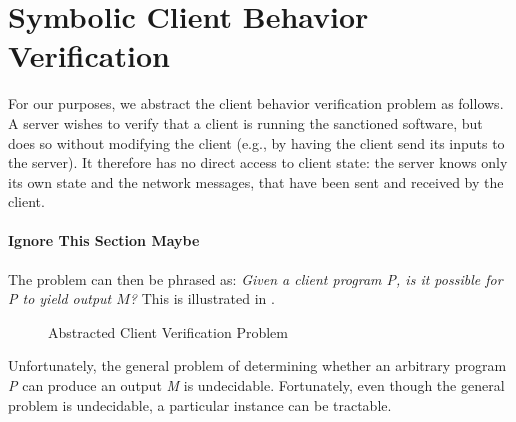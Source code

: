 \chapter{Symbolic Client Behavior Verification}
\label{ch:scbv}

\newcommand{\execTrace}[1]{\ensuremath{\mathrm{T}_{#1}}\xspace}
\newcommand{\program}[1]{\ensuremath{\mathrm{P}_{#1}}\xspace}
\newcommand{\server}[1]{\ensuremath{\mathrm{S}_{#1}}\xspace}
\newcommand{\clockTrace}[1]{\ensuremath{\mathrm{C}_{#1}}\xspace}
\newcommand{\memoryTrace}[1]{\ensuremath{\mathrm{V}_{#1}}\xspace}
\newcommand{\replayLog}[1]{\ensuremath{\mathrm{R}_{#1}}\xspace}
\newcommand{\lang}[1]{\ensuremath{\mathrm{L}_{#1}}\xspace}
\newcommand{\msgLang}[1]{\ensuremath{\mathrm{L}_{M}}\xspace}
\newcommand{\machine}[1]{\ensuremath{{\Lambda}_{R#1}}\xspace}
\newcommand{\symMachine}[1]{\ensuremath{\mathrm{\Lambda}_{SE#1}}\xspace}
\newcommand{\messageTrace}[1]{\ensuremath{\mathrm{M}_{#1}}\xspace}
\newcommand{\messageTraceAlt}[1]{\ensuremath{\mathrm{\hat{M}_{#1}}}\xspace}

For our purposes, we abstract the client behavior verification
problem as follows. A server wishes to verify that a
client is running the sanctioned software, but does so without
modifying the client (e.g., by having the client send its inputs to
the server).  It therefore has no direct access to client state: the
server knows only its own state and the network messages, that have
been sent and received by the client.

\subsubsection {Ignore This Section Maybe}

The problem can then be
phrased as: \emph{Given a client program P, is it possible for P to
yield output $M$?}  This is illustrated in .

\begin{figure}[t]
\centering
{}
\caption{Abstracted Client Verification Problem}\label{fig:intro:prob}
\end{figure}

Unfortunately, the general problem of determining whether an arbitrary
program \emph{P} can produce an output \emph{M} is undecidable. 
Fortunately, even though the general problem is undecidable, a
particular instance can be tractable.  

